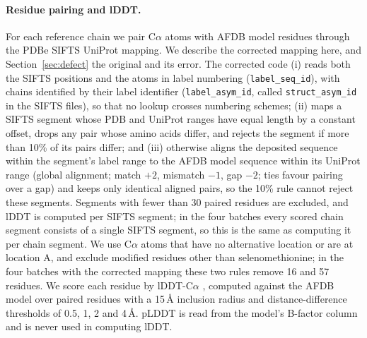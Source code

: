 \documentclass{article}
\begin{document}
\paragraph{Residue pairing and lDDT.} For each reference chain we pair
C$\alpha$ atoms with AFDB model residues through the PDBe SIFTS UniProt
mapping. We describe the corrected mapping here, and
Section~\ref{sec:defect} the original and its error. The corrected code
(i) reads both the SIFTS positions and the atoms in label numbering
(\texttt{label\_seq\_id}), with chains identified by their label identifier
(\texttt{label\_asym\_id}, called \texttt{struct\_asym\_id} in the SIFTS
files), so that no lookup crosses numbering schemes; (ii) maps a SIFTS segment whose PDB and UniProt ranges have equal length by a constant offset, drops any pair whose amino acids differ, and rejects the segment if more than 10\% of its pairs differ; and (iii) otherwise aligns the deposited sequence within the segment's label range to the AFDB model sequence within its UniProt range (global alignment; match $+2$, mismatch $-1$, gap $-2$; ties favour pairing over a gap) and keeps only identical aligned pairs, so the 10\% rule cannot reject these segments. Segments with fewer than 30 paired residues are excluded, and lDDT is computed per SIFTS segment; in the four batches every scored chain segment consists of a single SIFTS segment, so this is the same as computing it per chain segment. We use C$\alpha$ atoms that have no alternative location or are at location A, and exclude modified residues other than selenomethionine; in the four
batches with the corrected mapping these two rules remove 16 and 57
residues. We score each residue by lDDT-C$\alpha$ \citep{mariani2013},
computed against the AFDB model over paired residues with
a 15\,\AA{} inclusion radius and distance-difference thresholds of 0.5, 1, 2
and 4\,\AA. pLDDT is read from the model's B-factor column and is never used
in computing lDDT.
\end{document}
